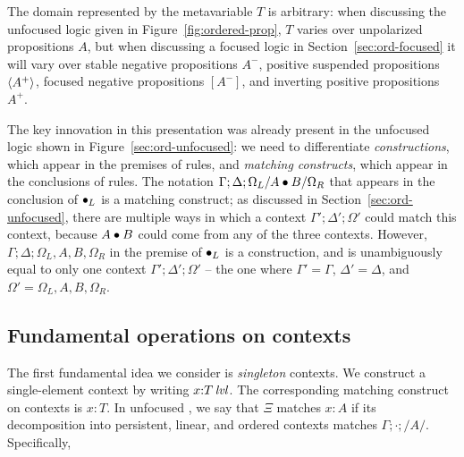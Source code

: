 The domain represented by the metavariable $T$ is arbitrary: when
discussing the unfocused logic given in Figure~\ref{fig:ordered-prop},
$T$ varies over unpolarized propositions $A$, but when discussing a
focused logic in Section~\ref{sec:ord-focused} it will vary over
stable negative propositions $A^-$, positive suspended propositions
$\langle {A^+} \rangle$, focused negative propositions $[A^-]$, and inverting
positive propositions $A^+$.




The key innovation in this presentation was already present in the
unfocused logic shown in Figure~\ref{sec:ord-unfocused}: we need to
differentiate {\it constructions}, which appear in the premises of
rules, and {\it matching constructs}, which appear in the conclusions
of rules.  The notation $\Gamma; \Delta; \Omega_L/A\mathbin{\bullet} B/\Omega_R$
that appears in the conclusion of ${\mathbin{\bullet}}_L$ is a matching construct;
as discussed in Section~\ref{sec:ord-unfocused}, there are multiple
ways in which a context $\Gamma'; \Delta'; \Omega'$ could match this
context, because $A \mathbin{\bullet} B$ could come from any of the three
contexts. However, $\Gamma; \Delta; \Omega_L,{A},{B}, \Omega_R$ in the
premise of ${\mathbin{\bullet}}_L$ is a construction, and is unambiguously equal
to only one context $\Gamma'; \Delta'; \Omega'$ -- the one where
$\Gamma' = \Gamma$, $\Delta' = \Delta$, and 
$\Omega' = \Omega_L, {A}, {B}, \Omega_R$.

\subsection{Fundamental operations on contexts}

The first fundamental idea we consider is {\it singleton} contexts.
We construct a single-element context by writing $x{:}{T}\,{{\it lvl}}$.
The corresponding matching construct on contexts is 
$x{:}{T}$. In unfocused \ollll, we say that $\Xi$ matches 
$x{:}{A}$ if its decomposition into persistent, linear, and 
ordered contexts matches $\Gamma; \cdot; /A/$. Specifically,

